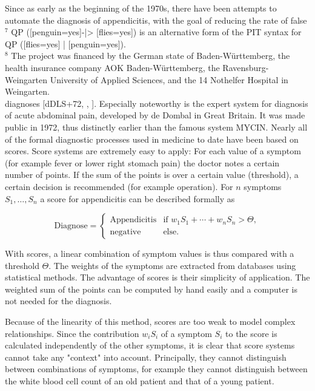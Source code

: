 \documentclass[10pt]{book}
\begin{document}
Since as early as the beginning of the 1970s, there have been attempts to automate the diagnosis of appendicitis, with the goal of reducing the rate of false\\
${ }^{7}$ QP ([penguin=yes]-|> [flies=yes]) is an alternative form of the PIT syntax for QP ([flies=yes] | [penguin=yes]).\\
${ }^{8}$ The project was financed by the German state of Baden-Württemberg, the health insurance company AOK Baden-Württemberg, the Ravensburg-Weingarten University of Applied Sciences, and the 14 Nothelfer Hospital in Weingarten.\\[0pt]
diagnoses [dDLS+72, \cite{ohmann1994bauchschmerzen}, \cite{ohmann1995diagnosescore}]. Especially noteworthy is the expert system for diagnosis of acute abdominal pain, developed by de Dombal in Great Britain. It was made public in 1972, thus distinctly earlier than the famous system MYCIN.
Nearly all of the formal diagnostic processes used in medicine to date have been based on scores. Score systems are extremely easy to apply: For each value of a symptom (for example fever or lower right stomach pain) the doctor notes a certain number of points. If the sum of the points is over a certain value (threshold), a certain decision is recommended (for example operation). For $n$ symptoms $S_{1}, \ldots, S_{n}$ a score for appendicitis can be described formally as

$$
\text{Diagnose}= \begin{cases}\text{Appendicitis} & \text{if } w_{1} S_{1}+\cdots+w_{n} S_{n}>\Theta, \\ \text{negative} & \text{else.}\end{cases}
$$

With scores, a linear combination of symptom values is thus compared with a threshold $\Theta$. The weights of the symptoms are extracted from databases using statistical methods. The advantage of scores is their simplicity of application. The weighted sum of the points can be computed by hand easily and a computer is not needed for the diagnosis.

Because of the linearity of this method, scores are too weak to model complex relationships. Since the contribution $w_{i} S_{i}$ of a symptom $S_{i}$ to the score is calculated independently of the other symptoms, it is clear that score systems cannot take any "context" into account. Principally, they cannot distinguish between combinations of symptoms, for example they cannot distinguish between the white blood cell count of an old patient and that of a young patient.
\end{document}
